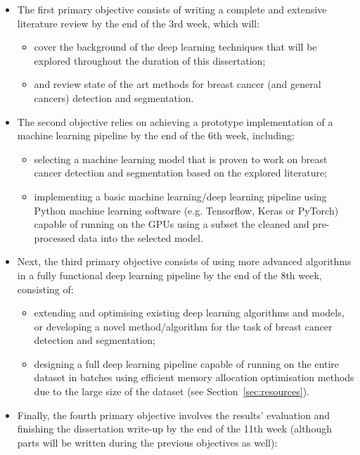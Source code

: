 \documentclass[letterpaper,12pt]{article}
\begin{document}
\begin{itemize}
    \item The first primary objective consists of writing a complete and extensive literature review by the end of the 3rd week, which will:
    \begin{itemize}
        \item cover the background of the deep learning techniques that will be explored throughout the duration of this dissertation;
        \item and review state of the art methods for breast cancer (and general cancers) detection and segmentation. 
    \end{itemize}
    \item The second objective relies on achieving a prototype implementation of a machine learning pipeline by the end of the 6th week, including:
    \begin{itemize}
        \item selecting a machine learning model that is proven to work on breast cancer detection and segmentation based on the explored literature;
        \item implementing a basic machine learning/deep learning pipeline using Python machine learning software (e.g. Tensorflow, Keras or PyTorch) capable of running on the GPUs using a subset the cleaned and pre-processed data into the selected model.
    \end{itemize}
    \item Next, the third primary objective consists of using more advanced algorithms in a fully functional deep learning pipeline by the end of the 8th week, consisting of:
    \begin{itemize}
        \item extending and optimising existing deep learning algorithms and models, or developing a novel method/algorithm  for the task of breast cancer detection and segmentation;
        \item designing a full deep learning pipeline capable of running on the entire dataset in batches using efficient memory allocation optimisation methods due to the large size of the dataset (see Section~\ref{sec:resources}).
    \end{itemize}
    \item Finally, the fourth primary objective involves the results' evaluation  and finishing the dissertation write-up by the end of the 11th week (although parts will be written during the previous objectives as well):
    \begin{itemize}

\end{itemize}
\end{itemize}
\end{document}

